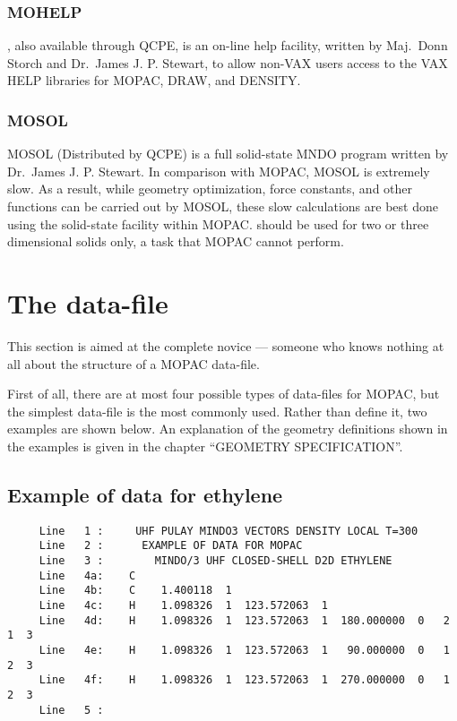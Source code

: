 \subsubsection{MOHELP}
   , also available through QCPE, is an  on-line  help  facility,
   written by Maj.\ Donn Storch and Dr.\ James J. P. Stewart, to allow non-VAX
   users access to the VAX HELP libraries for MOPAC, DRAW, 
   and DENSITY.
        
\subsubsection{MOSOL}
   MOSOL (Distributed by QCPE)  is  
   a  full  solid-state  MNDO  program
   written  by  Dr.\ James J. P. Stewart.  In comparison with MOPAC, MOSOL is
   extremely  slow.   As  a  result,  while  geometry  optimization,   force
   constants,  and  other  functions can be carried out by MOSOL, these slow
   calculations are best done using the solid-state facility  within  MOPAC.
    should be used for two or three dimensional solids only, a task
   that MOPAC cannot perform.

\section{The data-file}
This section is aimed at the complete novice --- someone  who  knows
nothing at all about the structure of a MOPAC data-file.

   First of all, there are at most four possible  types  of  data-files
   for  MOPAC, but the simplest data-file is the most commonly used.  Rather
   than define it, two examples are shown  below.   An  explanation  of  the
   geometry  definitions  shown  in  the  examples  is  given in the chapter
   ``GEOMETRY SPECIFICATION''.

\subsection{Example of data for ethylene}
\begin{verbatim}
     Line   1 :     UHF PULAY MINDO3 VECTORS DENSITY LOCAL T=300 
     Line   2 :      EXAMPLE OF DATA FOR MOPAC
     Line   3 :        MINDO/3 UHF CLOSED-SHELL D2D ETHYLENE
     Line   4a:    C 
     Line   4b:    C    1.400118  1 
     Line   4c:    H    1.098326  1  123.572063  1 
     Line   4d:    H    1.098326  1  123.572063  1  180.000000  0   2  1  3
     Line   4e:    H    1.098326  1  123.572063  1   90.000000  0   1  2  3
     Line   4f:    H    1.098326  1  123.572063  1  270.000000  0   1  2  3
     Line   5 : 
\end{verbatim}
        
